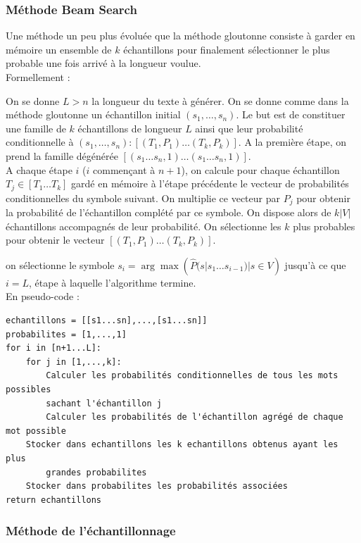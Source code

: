 \subsubsection{Méthode Beam Search}
Une méthode un peu plus évoluée que la méthode gloutonne consiste à garder en mémoire un ensemble de $k$ échantillons pour finalement sélectionner le plus probable une fois arrivé à la longueur voulue. \\

Formellement :

On se donne $L>n$ la longueur du texte à générer.
On se donne comme dans la méthode gloutonne un échantillon initial $(s_1,\ldots, s_n)$.
Le but est de constituer une famille de $k$ échantillons de longueur $L$ ainsi que leur probabilité conditionnelle à $(s_1,\ldots,s_n) : [(T_1,P_1)\ldots(T_k,P_k)]$.
A la première étape, on prend la famille dégénérée $[(s_1\ldots s_n, 1)\ldots (s_1\ldots s_n, 1)]$. \\

A chaque étape $i$ ($i$ commençant à $n+1$), on calcule pour chaque échantillon $T_j \in [T_1\ldots T_k]$ gardé en mémoire à l'étape précédente le vecteur de probabilités conditionnelles du symbole suivant. On multiplie ce vecteur par $P_j$ pour obtenir la probabilité de l'échantillon complété par ce symbole.
On dispose alors de $k\vert V \vert$ échantillons accompagnés de leur probabilité. On sélectionne les $k$ plus probables pour obtenir le vecteur $[(T_1,P_1)\ldots(T_k,P_k)]$.

on sélectionne le symbole $s_i = \arg\max({\widehat{P}(s|s_1\ldots s_{i-1}) | s \in V})$ jusqu'à ce que $i=L$, étape à laquelle l'algorithme termine. \\

En pseudo-code :
\begin{verbatim}
echantillons = [[s1...sn],...,[s1...sn]]
probabilites = [1,...,1]
for i in [n+1...L]:
    for j in [1,...,k]:
        Calculer les probabilités conditionnelles de tous les mots possibles 
        sachant l'échantillon j
        Calculer les probabilités de l'échantillon agrégé de chaque mot possible
    Stocker dans echantillons les k echantillons obtenus ayant les plus 
        grandes probabilites
    Stocker dans probabilites les probabilités associées
return echantillons
\end{verbatim}

\subsubsection{Méthode de l'échantillonnage}

